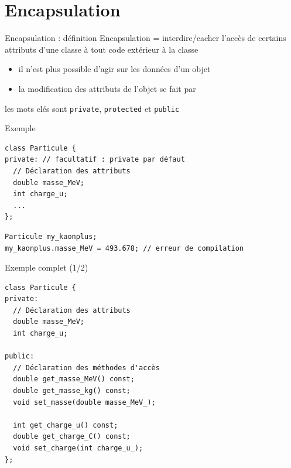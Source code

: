 \documentclass[c]{beamer}
\newcommand{\inline}[1]{\texttt{#1}}
\begin{document}

\section{Encapsulation}

\begin{frame}[fragile]{Encapsulation : définition}
Encapsulation = interdire/cacher l'accès de certains attributs d'une classe à tout code extérieur à la classe

\begin{itemize}
\item il n'est plus possible d'agir  sur les données d'un objet

\item la modification des attributs de l'objet se fait par 
\end{itemize}

 les mots clés sont \inline{private}, \inline{protected} et \inline{public}
\end{frame}

\begin{frame}[fragile]{Exemple}
\begin{verbatim}
class Particule {
private: // facultatif : private par défaut
  // Déclaration des attributs
  double masse_MeV;
  int charge_u;
  ...
};
\end{verbatim}
\pause
\vspace{1em}
\vspace{1em}
\begin{verbatim}
Particule my_kaonplus;
my_kaonplus.masse_MeV = 493.678; // erreur de compilation
\end{verbatim}
\end{frame}

\begin{frame}[fragile]{Exemple complet (1/2)}
 \begin{verbatim}
class Particule {
private:
  // Déclaration des attributs
  double masse_MeV;
  int charge_u;

public:
  // Déclaration des méthodes d'accès
  double get_masse_MeV() const;
  double get_masse_kg() const;
  void set_masse(double masse_MeV_);

  int get_charge_u() const;
  double get_charge_C() const;
  void set_charge(int charge_u_);
};
\end{verbatim}
\end{frame}
\end{document}
